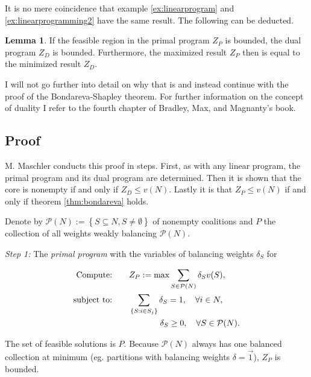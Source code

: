 \documentclass[10pt,a4paper,titlepage]{article}
\theoremstyle{plain}
\theoremstyle{definition}
\newtheorem{lemma}[thm]{Lemma}
\begin{document}
It is no mere coincidence that example \ref{ex:linearprogram} and \ref{ex:linearprogramming2} have the same result. The following can be deducted.

\begin{lemma}\label{lem:feasibleregion}
    If the feasible region in the primal program $Z_P$ is bounded, the dual program $Z_D$ is bounded. Furthermore, the maximized result $Z_P$ then is equal to the minimized result $Z_D$.
\end{lemma}

I will not go further into detail on why that is and instead continue with the proof of the Bondareva-Shapley theorem. For further information on the concept of duality I refer to the fourth chapter of Bradley, Max, and Magnanty's\cite{bradley} book.

\subsection{Proof}
M. Maschler\cite{maschler} conducts this proof in steps. First, as with any linear program, the primal program and its dual program are determined. Then it is shown that the core is nonempty if and only if $Z_D \leq v(N)$. Lastly it is that $Z_P \leq v(N)$ if and only if theorem \ref{thm:bondareva} holds.

Denote by $\mathcal{P}(N) := \left\{S \subseteq N, S \neq \emptyset \right\}$ of nonempty coalitions and $P$ the collection of all weights weakly balancing $\mathcal{P}(N)$.\vspace{8pt}

\textit{Step 1:} The \textit{primal program} with the variables of balancing weights $\delta_S$ for\vspace{-15pt}

\begin{alignat*}{2}
    \text{Compute:}\qquad& Z_P := \text{max} \sum_{S \in \mathcal{P}(N)} \delta_S v(S) ,\\
    \text{subject to:}\qquad& \sum_{\{S: i \in S_j\}}\delta_S = 1,\quad \forall i \in N,\\
    & \hphantom{\sum_{\{S: i \in S_j\}}.} \delta_S \geq 0,\quad \forall S \in \mathcal{P}(N).
\end{alignat*}

The set of feasible solutions is $P$. Because $\mathcal{P}(N)$ always has one balanced collection at minimum (eg. partitions with balancing weights $\delta = \vec{1}$), $Z_P$ is bounded.\vspace{8pt}
\end{document}

